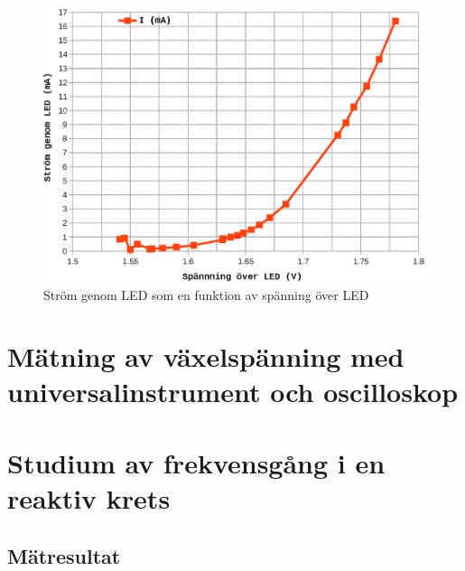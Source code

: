 \documentclass[11pt,a4paper]{article}
\begin{document}
\begin{figure}
    \centering
    \includegraphics[width=\linewidth]{img/6-led_data-graf2}
    \caption[Ström genom LED som funktion av spänning över LED]
    {Ström genom LED som en funktion av spänning över LED}
    \label{fig:led-data-graf2}
\end{figure}

\section{Mätning av växelspänning med universalinstrument och oscilloskop}\label{}


\section{Studium av frekvensgång i en reaktiv krets}\label{}

\subsection{Mätresultat}\label{}
\end{document}
